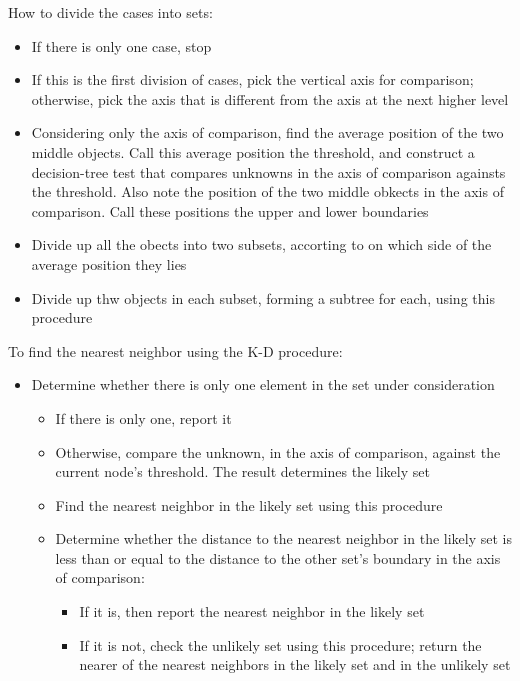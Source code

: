 \documentclass{article}
\begin{document}
How to divide the cases into sets:
\begin{itemize}
  \item If there is only one case, stop
  \item If this is the first division of cases, pick the vertical
    axis for comparison; otherwise, pick the axis that is
    different from the axis at the next higher level
  \item Considering only the axis of comparison, find the average
    position of the two middle objects. Call this average position
    the threshold, and construct a decision-tree test that
    compares unknowns in the axis of comparison againsts the
    threshold. Also note the position of the two middle obkects in
    the axis of comparison. Call these positions the upper and
    lower boundaries
  \item Divide up all the obects into two subsets, accorting to on
    which side of the average position they lies
  \item Divide up thw objects in each subset, forming a subtree
    for each, using this procedure
\end{itemize}

To find the nearest neighbor using the K-D procedure:
\begin{itemize}
  \item Determine whether there is only one element in the set
    under consideration
  \begin{itemize}
    \item If there is only one, report it
    \item Otherwise, compare the unknown, in the axis of
      comparison, against the current node's threshold. The result
      determines the likely set
    \item Find the nearest neighbor in the likely set using this
      procedure
    \item Determine whether the distance to the nearest neighbor
      in the likely set is less than or equal to the distance to
      the other set's boundary in the axis of comparison:
      \begin{itemize}
        \item If it is, then report the nearest neighbor in the
          likely set
        \item If it is not, check the unlikely set using this
          procedure; return the nearer of the nearest neighbors in
          the likely set and in the unlikely set
      \end{itemize}
  \end{itemize}
\end{itemize}
\end{document}
